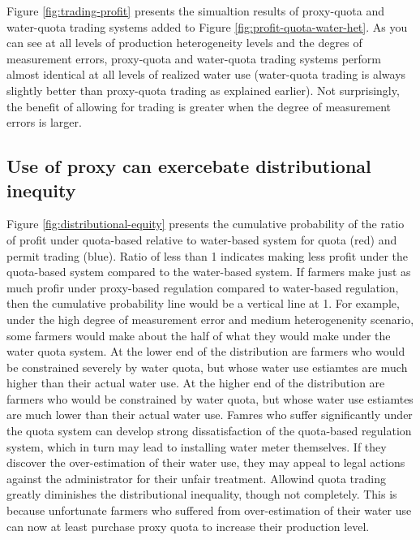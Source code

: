 \documentclass[
]{article}
\begin{document}
Figure \ref{fig:trading-profit} presents the simualtion results of proxy-quota and water-quota trading systems added to Figure \ref{fig:profit-quota-water-het}. As you can see at all levels of production heterogeneity levels and the degres of measurement errors, proxy-quota and water-quota trading systems perform almost identical at all levels of realized water use (water-quota trading is always slightly better than proxy-quota trading as explained earlier). Not surprisingly, the benefit of allowing for trading is greater when the degree of measurement errors is larger.

\subsection{Use of proxy can exercebate distributional inequity}\label{use-of-proxy-can-exercebate-distributional-inequity}

Figure \ref{fig:distributional-equity} presents the cumulative probability of the ratio of profit under quota-based relative to water-based system for quota (red) and permit trading (blue). Ratio of less than 1 indicates making less profit under the quota-based system compared to the water-based system. If farmers make just as much profir under proxy-based regulation compared to water-based regulation, then the cumulative probability line would be a vertical line at 1. For example, under the high degree of measurement error and medium heterogenenity scenario, some farmers would make about the half of what they would make under the water quota system. At the lower end of the distribution are farmers who would be constrained severely by water quota, but whose water use estiamtes are much higher than their actual water use. At the higher end of the distribution are farmers who would be constrained by water quota, but whose water use estiamtes are much lower than their actual water use. Famres who suffer significantly under the quota system can develop strong dissatisfaction of the quota-based regulation system, which in turn may lead to installing water meter themselves. If they discover the over-estimation of their water use, they may appeal to legal actions against the administrator for their unfair treatment. Allowind quota trading greatly diminishes the distributional inequality, though not completely. This is because unfortunate farmers who suffered from over-estimation of their water use can now at least purchase proxy quota to increase their production level.
\end{document}
